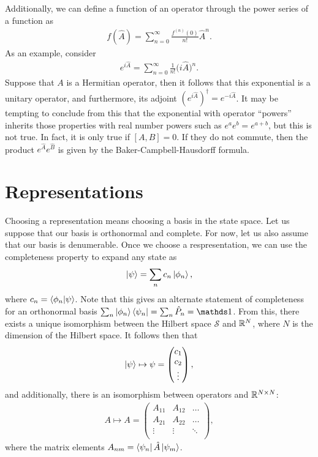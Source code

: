 Additionally, we can define a function of an operator through the power series of a function as
\begin{eqnarray}
    f(\hat{A}) = \sum_{n=0}^{\infty} \frac{f^{(n)}(0)}{n!} \hat{A}^{n}
.\end{eqnarray}
As an example, consider 
\begin{eqnarray}
    e^{i \hat{A}} = \sum_{n=0}^{\infty} \frac{1}{n!} \Big( i \hat{A} \Big)^{n}
.\end{eqnarray}
Suppose that $A$ is a Hermitian operator, then it follows that this exponential is a unitary operator, and furthermore, its adjoint $(e^{i \hat{A}})^{\dagger} = e^{-i \hat{A}}$.
It may be tempting to conclude from this that the exponential with operator ``powers'' inherits those properties with real number powers such as $e^{a}e^{b} = e^{a + b}$, but this is not true.
In fact, it is only true if $[A,B] = 0$.
If they do not commute, then the product $e^{\hat{A}} e^{\hat{B}}$ is given by the Baker-Campbell-Hausdorff formula.


\section{Representations}

Choosing a representation means choosing a basis in the state space.
Let us suppose that our basis is orthonormal and complete.
For now, let us also assume that our basis is denumerable.
Once we choose a respresentation, we can use the completeness property to expand any state as
\begin{eqnarray}
    \ket{\psi} = \sum_{n} c_{n} \ket{\phi_{n}}
,\end{eqnarray}
where $c_{n} = \bra{\phi_{n}}\ket{\psi}$.
Note that this gives an alternate statement of completeness for an orthonormal basis $\sum_{n} \ket{\phi_{n}} \bra{\psi_{n}} = \sum_{n} \hat{P}_{n} = \id$.
From this, there exists a unique isomorphism between the Hilbert space $\mathcal{S}$ and $\mathbb{R}^{N}$, where $N$ is the dimension of the Hilbert space.
It follows then that
\begin{align}
    \ket{\psi} \mapsto \psi = \begin{pmatrix}
        c_1 \\ c_2 \\ \vdots
    \end{pmatrix}
,\end{align}
and additionally, there is an isomorphism between operators and $\mathbb{R}^{N \times N}$:
\begin{eqnarray}
    A \mapsto A = \begin{pmatrix}
        A_{11} & A_{12} & \ldots \\
        A_{21} & A_{22} & \ldots \\
        \vdots & \vdots & \ddots \\
    \end{pmatrix}
,\end{eqnarray}
where the matrix elements $A_{nm} = \bra{\psi_{n}} \hat{A} \ket{\psi_{m}}$.


